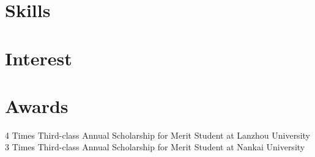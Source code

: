 \documentclass[11pt,a4paper, final]{moderncv}
\newcommand{\spacesection}{\vspace{0.4cm}}
\begin{document}
\section{\textbf{Skills}}
\section{\textbf{Interest}}
\section{\textbf{Awards}}
		{4 Times Third-class Annual Scholarship for Merit Student at Lanzhou University}
		{3 Times Third-class Annual Scholarship for Merit Student at Nankai University}
\end{document}
